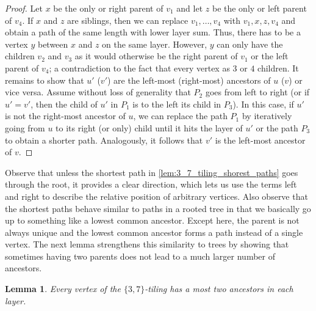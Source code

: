\documentclass[11pt]{article}
\newtheorem{lemma}[theorem]{Lemma}
\begin{document}
\begin{proof}
    Let $x$ be the only or right parent of $v_1$ and let $z$ be the only or left parent of $v_4$.
    If $x$ and $z$ are siblings, then we can replace $v_1, \dots, v_4$ with $v_1, x, z, v_4$ and obtain a path of the same length with lower layer sum.
    Thus, there has to be a vertex $y$ between $x$ and $z$ on the same layer.
    However, $y$ can only have the children $v_2$ and $v_3$ as it would otherwise be the right parent of $v_1$ or the left parent of $v_4$; a contradiction to the fact that every vertex as $3$ or $4$ children.
%
    It remains to show that $u'$ ($v'$) are the left-most (right-most) ancestors of $u$ ($v$) or vice versa.
    Assume without loss of generality that $P_2$ goes from left to right (or if $u' = v'$, then the child of $u'$ in $P_1$ is to the left its child in $P_3$).
    In this case, if $u'$ is not the right-most ancestor of $u$, we can replace the path $P_1$ by iteratively going from $u$ to its right (or only) child until it hits the layer of $u'$ or the path $P_3$ to obtain a shorter path.
    Analogously, it follows that $v'$ is the left-most ancestor of $v$.
\end{proof}
%
Observe that unless the shortest path in \cref{lem:3_7_tiling_shorest_paths} goes through the root, it provides a clear direction, which lets us use the terms left and right to describe the relative position of arbitrary vertices.
%
Also observe that the shortest paths behave similar to paths in a rooted tree in that we basically go up to something like a lowest common ancestor.
Except here, the parent is not always unique and the lowest common ancestor forms a path instead of a single vertex.
The next lemma strengthens this similarity to trees by showing that sometimes having two parents does not lead to a much larger number of ancestors.
%
\begin{lemma}
    \label{lem:3_7_tiling_at_most_two_ancestors}
    Every vertex of the $\{3, 7\}$-tiling has a most two ancestors in each layer.
\end{lemma}
\end{document}
